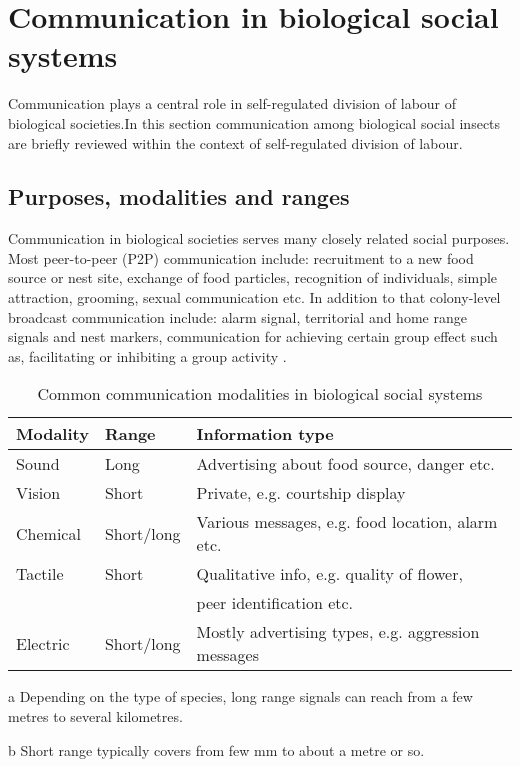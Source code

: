 \section{Communication in biological social systems}
\label{bg:bio-comm}
Communication plays a central role in self-regulated division of labour of biological societies.In this section communication among biological social insects are briefly reviewed within the context of self-regulated  division of labour.

\subsection{Purposes, modalities and ranges}
Communication in biological societies serves many closely related social purposes. Most peer-to-peer (P2P) communication include: recruitment to a new food source or nest site, exchange of food particles, recognition of individuals, simple attraction, grooming, sexual communication etc. In addition to that colony-level broadcast communication include: alarm signal, territorial and home range signals and nest markers, communication for achieving certain group effect such as, facilitating or inhibiting  a group activity \cite{Holldobler1990}.\\
\begin{table}
\caption{Common communication modalities in biological social systems}
\label{table:bio-comm-modalities}
\begin{center}
\begin{threeparttable}
\begin{tabular}{|l|l|l|}
\hline \textbf{Modality} & \textbf{Range} & \textbf{Information type}\\
\hline Sound & Long\tnote{a} & Advertising about food  source,  danger etc. \\                                                                                                                                               
\hline Vision & Short\tnote{b}  & Private, e.g. courtship display \\
\hline Chemical  & Short/long & Various messages, e.g. food location, alarm etc.\\
\hline Tactile & Short & Qualitative info, e.g. quality of flower,\\ & & peer identification etc.\\
\hline Electric & Short/long & Mostly advertising types, e.g. aggression messages\\
\hline
\end{tabular}
\begin{tablenotes}
\item [a]Depending on the type of species, long range signals can reach from a few metres to several kilometres.
\item [b]Short range typically covers from few mm to about a metre or so.
\end{tablenotes}
\end{threeparttable}
\end{center}
\end{table}
